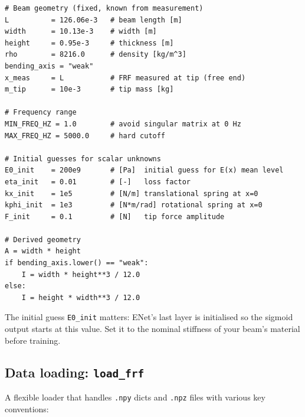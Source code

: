 \documentclass[11pt,a4paper]{article}
\begin{document}
\begin{lstlisting}[caption={Beam geometry and initial parameter guesses}]
# Beam geometry (fixed, known from measurement)
L          = 126.06e-3   # beam length [m]
width      = 10.13e-3    # width [m]
height     = 0.95e-3     # thickness [m]
rho        = 8216.0      # density [kg/m^3]
bending_axis = "weak"
x_meas     = L           # FRF measured at tip (free end)
m_tip      = 10e-3       # tip mass [kg]

# Frequency range
MIN_FREQ_HZ = 1.0        # avoid singular matrix at 0 Hz
MAX_FREQ_HZ = 5000.0     # hard cutoff

# Initial guesses for scalar unknowns
E0_init    = 200e9       # [Pa]  initial guess for E(x) mean level
eta_init   = 0.01        # [-]   loss factor
kx_init    = 1e5         # [N/m] translational spring at x=0
kphi_init  = 1e3         # [N*m/rad] rotational spring at x=0
F_init     = 0.1         # [N]   tip force amplitude

# Derived geometry
A = width * height
if bending_axis.lower() == "weak":
    I = width * height**3 / 12.0
else:
    I = height * width**3 / 12.0
\end{lstlisting}

The initial guess \texttt{E0\_init} matters: ENet's last layer is initialised so the sigmoid output starts at this value. Set it to the nominal stiffness of your beam's material before training.

\subsection{Data loading: \texttt{load\_frf}}

A flexible loader that handles \texttt{.npy} dicts and \texttt{.npz} files with various key conventions:
\end{document}
